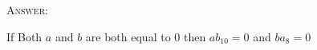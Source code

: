 \textsc{Answer:}\vspace{-2mm}
\begin{answerlong}
If Both $a$ and $b$ are both equal to $0$ then $ab_{10} = 0$ and $ba_{8} = 0$ 
\end{answerlong}
